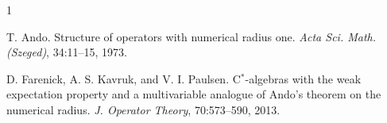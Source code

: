 \documentclass[a4paper]{amsart}
\begin{document}
\begin{thebibliography}{1}

T. Ando.
\newblock Structure of operators with numerical radius one.
\newblock \emph{{A}cta {S}ci. {M}ath. ({S}zeged)}, 34:11--15, 1973.

D. {Farenick}, A. S. {Kavruk}, and V. I. {Paulsen}.
\newblock C$^*$-algebras with the weak expectation property and a multivariable
  analogue of {A}ndo's theorem on the numerical radius.
\newblock \emph{J. Operator Theory}, 70:573--590, 2013.

%
\end{thebibliography}
\end{document}
